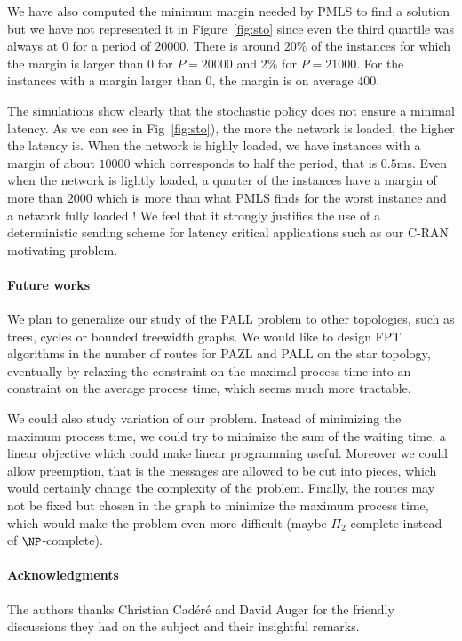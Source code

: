 \documentclass[a4paper,10pt]{article}
\begin{document}
     We have also computed the minimum margin needed by PMLS to find a solution but we have not represented it in Figure~\ref{fig:sto} since even the third quartile was always at $0$ for a period of $20000$.
     There is around $20\%$ of the instances for which the margin is larger than $0$ for $P=20000$ and $2\%$
     for $P = 21000$. For the instances with a margin larger than $0$, the margin is on average $400$.
     
     The simulations show clearly that the stochastic policy does not ensure a minimal latency. As we can see in Fig~\ref{fig:sto}), the more the network is loaded, the higher the latency is. When the network is highly loaded,
     we have instances with a margin of about $10000$ which corresponds to half the period, that is $0.5$ms. 
     Even when the network is lightly loaded, a quarter of the instances have a margin of more than $2000$
     which is more than what PMLS finds for the worst instance and a network fully loaded ! 
     We feel that it strongly justifies the use of a deterministic sending scheme for latency critical applications such as our C-RAN motivating problem.
     
    
    \paragraph*{Future works}
   
   We plan to generalize our study of the PALL problem to other topologies,
   such as trees, cycles or bounded treewidth graphs. 
   We would like to design FPT algorithms in the number of routes for PAZL and PALL on the star topology, eventually by relaxing the constraint on the maximal process time into an constraint on the average process time, which seems much more tractable. 
   
   We could also study variation of our problem. Instead of minimizing the maximum process time, we could try to minimize
   the sum of the waiting time, a linear objective which could make linear programming useful.
   Moreover we could allow preemption, that is the messages are allowed to be cut into pieces, which would certainly change the complexity of the problem. 
   Finally, the routes may not be fixed but chosen in the graph to minimize the maximum process time, which would make the problem even more difficult (maybe $\Pi_2$-complete instead of $\NP$-complete). 

   
  \paragraph*{Acknowledgments} The authors thanks Christian Cad\'er\'e and David Auger for the friendly discussions
  they had on the subject and their insightful remarks. 



\end{document}
